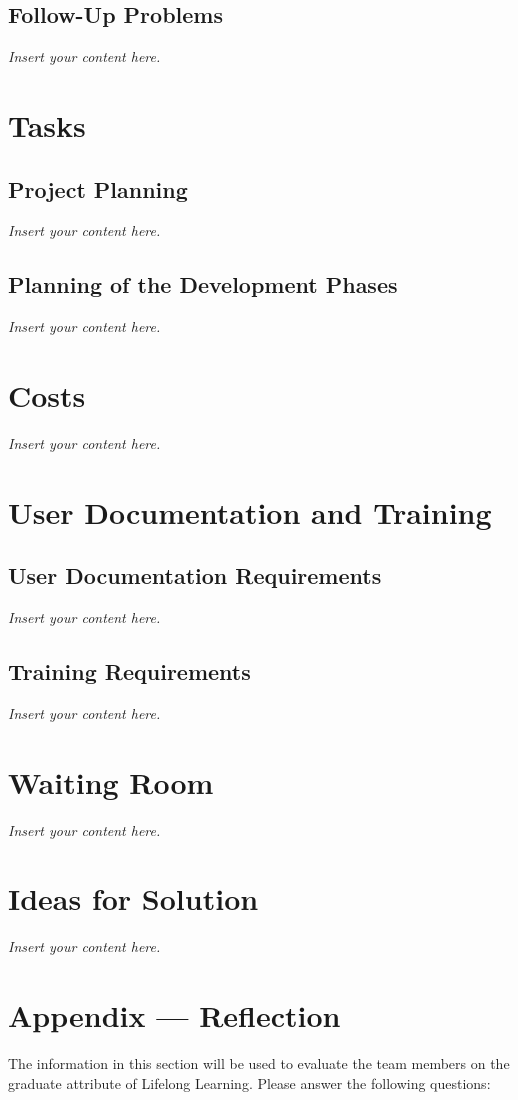 \documentclass[12pt]{article}
\newcommand{\lips}{\textit{Insert your content here.}}
\begin{document}
\subsection{Follow-Up Problems}
\lips

\section{Tasks}
\subsection{Project Planning}
\lips
\subsection{Planning of the Development Phases}
\lips

\section{Costs}
\lips
\section{User Documentation and Training}
\subsection{User Documentation Requirements}
\lips
\subsection{Training Requirements}
\lips

\section{Waiting Room}
\lips

\section{Ideas for Solution}
\lips

\newpage{}
\section*{Appendix --- Reflection}

The information in this section will be used to evaluate the team members on the
graduate attribute of Lifelong Learning.  Please answer the following questions:
\end{document}
